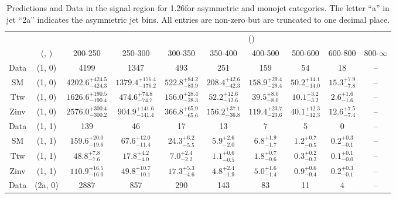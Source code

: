 \begin{table}[h!]
\tiny
\centering
\caption{Predictions and Data in the signal region for 1.26\ifb for asymmetric and monojet categories. The letter ``a'' in jet \eg ``2a''  indicates the asymmetric jet bins. All entries are non-zero but are truncated to one decimal place.\label{tab:predall_sig_comb_asym}}
\begin{tabular}
{cccccccccc}
	\hline\hline
&	&	& \multicolumn{8}{c}{\scalht (\gev)}\\ 
	&	 (\njet, \nb) & 200-250 & 250-300 & 300-350 & 350-400 & 400-500 & 500-600 & 600-800 & 800-$\infty$ \\ [0.8ex] 
\hline
	Data & (1, 0) & 4199 & 1347 & 493 & 251 & 159 & 54 & 18 & -- \\[0.5ex] 
	SM & (1, 0) & $4202.6^{+ 424.5 }_{- 424.3 }$ & $1379.4^{+ 176.4 }_{- 176.2 }$ & $522.8^{+ 84.2 }_{- 83.9 }$ & $208.4^{+ 42.6 }_{- 42.3 }$ & $158.9^{+ 29.4 }_{- 29.4 }$ & $50.2^{+ 14.1 }_{- 14.0 }$ & $15.3^{+ 7.9 }_{- 7.8 }$ & -- \\[0.5ex] 
	Ttw & (1, 0) & $1626.6^{+ 190.5 }_{- 190.4 }$ & $474.6^{+ 74.8 }_{- 74.7 }$ & $156.0^{+ 28.4 }_{- 28.3 }$ & $52.2^{+ 12.6 }_{- 12.6 }$ & $39.5^{+ 8.0 }_{- 8.0 }$ & $10.1^{+ 3.2 }_{- 3.2 }$ & $2.6^{+ 1.6 }_{- 1.6 }$ & -- \\[0.5ex] 
	Zinv & (1, 0) & $2576.0^{+ 300.4 }_{- 300.2 }$ & $904.9^{+ 141.6 }_{- 141.4 }$ & $366.8^{+ 65.9 }_{- 65.6 }$ & $156.2^{+ 37.1 }_{- 36.8 }$ & $119.4^{+ 23.7 }_{- 23.6 }$ & $40.1^{+ 12.3 }_{- 12.3 }$ & $12.6^{+ 7.5 }_{- 7.4 }$ & -- \\[0.5ex] 
	Data & (1, 1) & 139 & 46 & 17 & 13 & 7 & 5 & 0 & -- \\[0.5ex] 
	SM & (1, 1) & $159.6^{+ 20.0 }_{- 19.6 }$ & $67.6^{+ 12.0 }_{- 11.4 }$ & $24.3^{+ 6.2 }_{- 5.5 }$ & $5.9^{+ 2.6 }_{- 2.0 }$ & $6.8^{+ 1.9 }_{- 1.7 }$ & $1.2^{+ 0.7 }_{- 0.5 }$ & $0.2^{+ 0.3 }_{- 0.1 }$ & -- \\[0.5ex] 
	Ttw & (1, 1) & $48.8^{+ 7.8 }_{- 7.6 }$ & $17.8^{+ 4.2 }_{- 4.0 }$ & $7.0^{+ 2.4 }_{- 2.2 }$ & $1.1^{+ 0.6 }_{- 0.5 }$ & $1.8^{+ 0.7 }_{- 0.6 }$ & $0.3^{+ 0.2 }_{- 0.2 }$ & $0.1^{+ 0.1 }_{- 0.0 }$ & -- \\[0.5ex] 
	Zinv & (1, 1) & $110.9^{+ 16.5 }_{- 16.0 }$ & $49.8^{+ 10.7 }_{- 10.1 }$ & $17.3^{+ 5.3 }_{- 4.6 }$ & $4.8^{+ 2.4 }_{- 1.9 }$ & $5.0^{+ 1.6 }_{- 1.4 }$ & $0.9^{+ 0.6 }_{- 0.4 }$ & $0.2^{+ 0.3 }_{- 0.1 }$ & -- \\[0.5ex] 
	Data & (2a, 0) & 2887 & 857 & 290 & 143 & 83 & 11 & 4 & -- \\[0.5ex] 

\end{tabular}
\end{table}
